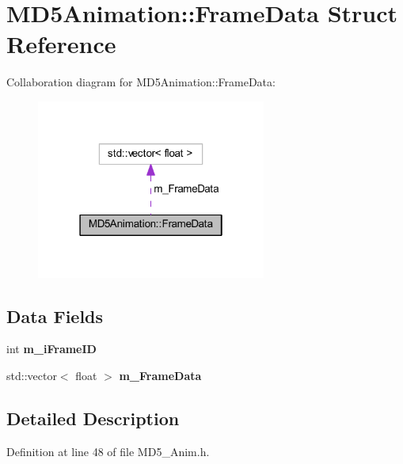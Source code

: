 \hypertarget{struct_m_d5_animation_1_1_frame_data}{}\section{M\+D5\+Animation\+:\+:Frame\+Data Struct Reference}
\label{struct_m_d5_animation_1_1_frame_data}


Collaboration diagram for M\+D5\+Animation\+:\+:Frame\+Data\+:
\nopagebreak
\begin{figure}[H]
\begin{center}
\leavevmode
\includegraphics[width=214pt]{struct_m_d5_animation_1_1_frame_data__coll__graph}
\end{center}
\end{figure}
\subsection*{Data Fields}
\begin{DoxyCompactItemize}
\item 
int {\bfseries m\+\_\+i\+Frame\+ID}\hypertarget{struct_m_d5_animation_1_1_frame_data_aabde95278d7c492302eff0588d4df8ae}{}\label{struct_m_d5_animation_1_1_frame_data_aabde95278d7c492302eff0588d4df8ae}

\item 
std\+::vector$<$ float $>$ {\bfseries m\+\_\+\+Frame\+Data}\hypertarget{struct_m_d5_animation_1_1_frame_data_aae7ffea26bf8b0ea133a0ed2e04f164f}{}\label{struct_m_d5_animation_1_1_frame_data_aae7ffea26bf8b0ea133a0ed2e04f164f}

\end{DoxyCompactItemize}


\subsection{Detailed Description}


Definition at line 48 of file M\+D5\+\_\+\+Anim.\+h.

